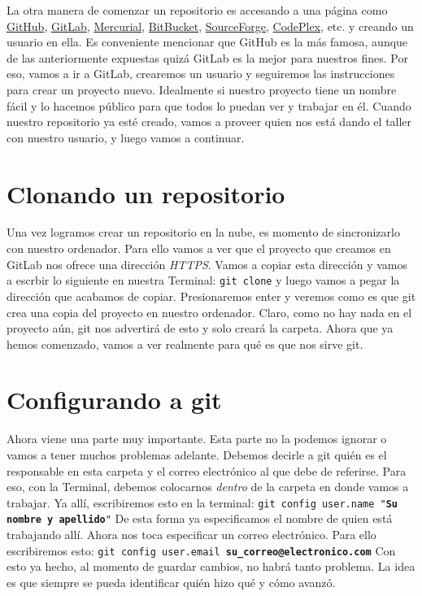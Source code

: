 \documentclass[10pt,letterpaper]{article}
\newcommand{\inlinecode}[1]{
\colorbox{light-gray}{\texttt{#1}}
}
\begin{document}
La otra manera de comenzar un repositorio es accesando a una p\'agina como \href{https://github.com/}{GitHub}, \href{https://gitlab.com/}{GitLab}, \href{https://mercurial.selenic.com/}{Mercurial}, \href{https://bitbucket.org/}{BitBucket}, \href{http://sourceforge.net/}{SourceForge}, \href{http://www.codeplex.com/}{CodePlex}, etc. y creando un usuario en ella. Es conveniente mencionar que GitHub es la m\'as famosa, aunque de las anteriormente expuestas quiz\'a GitLab es la mejor para nuestros fines. Por eso, vamos a ir a GitLab, crearemos un usuario y seguiremos las instrucciones para crear un proyecto nuevo. Idealmente si nuestro proyecto tiene un nombre f\'acil y lo hacemos p\'ublico para que todos lo puedan ver y trabajar en \'el. Cuando nuestro repositorio ya est\'e creado, vamos a proveer quien nos est\'a dando el taller con nuestro usuario, y luego vamos a continuar.

\section{Clonando un repositorio}
Una vez logramos crear un repositorio en la nube, es momento de sincronizarlo con nuestro ordenador. Para ello vamos a ver que el proyecto que creamos en GitLab nos ofrece una direcci\'on \emph{HTTPS}. Vamos a copiar esta direcci\'on y vamos a escrbir lo siguiente en nuestra Terminal: \inlinecode{git clone} y luego vamos a pegar la direcci\'on que acabamos de copiar. Presionaremos enter y veremos como es que git crea una copia del proyecto en nuestro ordenador. Claro, como no hay nada en el proyecto a\'un, git nos advertir\'a de esto y solo crear\'a la carpeta. Ahora que ya hemos comenzado, vamos a ver realmente para qu\'e es que nos sirve git.

\section{Configurando a git}
Ahora viene una parte muy importante. Esta parte no la podemos ignorar o vamos a tener muchos problemas adelante. Debemos decirle a git qui\'en es el responsable en esta carpeta y el correo electr\'onico al que debe de referirse. Para eso, con la Terminal, debemos colocarnos \emph{dentro} de la carpeta en donde vamos a trabajar. Ya all\'i, escribiremos esto en la terminal: \inlinecode{git config user.name "\textbf{Su nombre y apellido}"} De esta forma ya especificamos el nombre de quien est\'a trabajando all\'i. Ahora nos toca especificar un correo electr\'onico. Para ello escribiremos esto: \inlinecode{git config user.email \textbf{su\_correo@electronico.com}} Con esto ya hecho, al momento de guardar cambios, no habr\'a tanto problema. La idea es que siempre se pueda identificar qui\'en hizo qu\'e y c\'omo avanz\'o.
\end{document}
